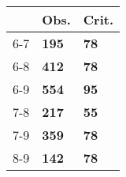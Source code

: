 \begin{table}[ht]
\centering
\begin{tabular}{rll}
  \hline
 & Obs. & Crit. \\ 
  \hline
6-7 & \textbf{195} & \textbf{78} \\ 
  6-8 & \textbf{412} & \textbf{78} \\ 
  6-9 & \textbf{554} & \textbf{95} \\ 
  7-8 & \textbf{217} & \textbf{55} \\ 
  7-9 & \textbf{359} & \textbf{78} \\ 
  8-9 & \textbf{142} & \textbf{78} \\ 
   \hline
\end{tabular}
\end{table}
